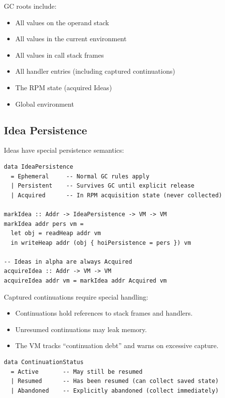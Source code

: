 \begin{definition}
\label{def:gc-roots}
GC roots include:
\begin{itemize}
  \item All values on the operand stack
  \item All values in the current environment
  \item All values in call stack frames
  \item All handler entries (including captured continuations)
  \item The RPM state (acquired Ideas)
  \item Global environment
\end{itemize}
\end{definition}

\subsection{Idea Persistence}
\label{subsec:idea-persistence}

\begin{definition}
\label{def:idea-persistence}
Ideas have special persistence semantics:
\begin{verbatim}
data IdeaPersistence
  = Ephemeral     -- Normal GC rules apply
  | Persistent    -- Survives GC until explicit release
  | Acquired      -- In RPM acquisition state (never collected)

markIdea :: Addr -> IdeaPersistence -> VM -> VM
markIdea addr pers vm =
  let obj = readHeap addr vm
  in writeHeap addr (obj { hoiPersistence = pers }) vm

-- Ideas in alpha are always Acquired
acquireIdea :: Addr -> VM -> VM
acquireIdea addr vm = markIdea addr Acquired vm
\end{verbatim}
\end{definition}

\begin{definition}[Continuation GC]
\label{def:continuation-gc}
Captured continuations require special handling:
\begin{itemize}
  \item Continuations hold references to stack frames and handlers.
  \item Unresumed continuations may leak memory.
  \item The VM tracks ``continuation debt'' and warns on excessive capture.
\end{itemize}
\begin{verbatim}
data ContinuationStatus
  = Active       -- May still be resumed
  | Resumed      -- Has been resumed (can collect saved state)
  | Abandoned    -- Explicitly abandoned (collect immediately)
\end{verbatim}
\end{definition}

